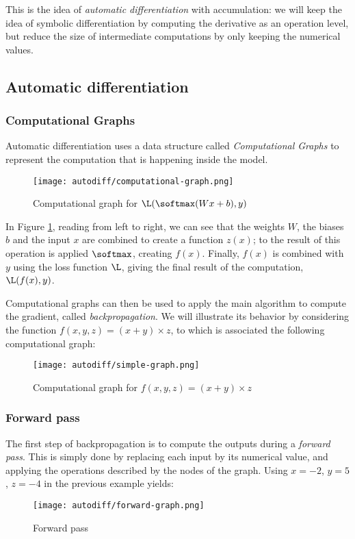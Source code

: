 This is the idea of \emph{automatic differentiation} with accumulation: we will keep the idea of symbolic differentiation by computing the derivative as an operation level, but reduce the size of intermediate computations by only keeping the numerical values.

\subsection{Automatic differentiation}
\subsubsection{Computational Graphs}
Automatic differentiation uses a data structure called \emph{Computational Graphs} to represent the computation that is happening inside the model.
\begin{figure}[H]
    \centering
    \texttt{[image: autodiff/computational-graph.png]}
    \caption{Computational graph for $\L(\softmax(Wx+b), y)$}
    \label{fig:computational-graph}
\end{figure}
In Figure \ref{fig:computational-graph}, reading from left to right, we can see that the weights $W$, the biases $b$ and the input $x$ are combined to create a function $z(x)$; to the result of this operation is applied $\softmax$, creating $f(x)$. Finally, $f(x)$ is combined with $y$ using the loss function $\L$, giving the final result of the computation, $\L(f(x), y)$.

Computational graphs can then be used to apply the main algorithm to compute the gradient, called \emph{backpropagation}. We will illustrate its behavior by considering the function $f(x, y, z) = (x+y)\times z$, to which is associated the following computational graph:
\begin{figure}[H]
    \centering
    \texttt{[image: autodiff/simple-graph.png]}
    \caption{Computational graph for $f(x, y, z) = (x+y)\times z$}
\end{figure}

\subsubsection{Forward pass}
The first step of backpropagation is to compute the outputs during a \emph{forward pass}. This is simply done by replacing each input by its numerical value, and applying the operations described by the nodes of the graph. Using $x=-2$, $y=5$, $z=-4$ in the previous example yields:
\begin{figure}[H]
    \centering
    \texttt{[image: autodiff/forward-graph.png]}
    \caption{Forward pass}
\end{figure}

